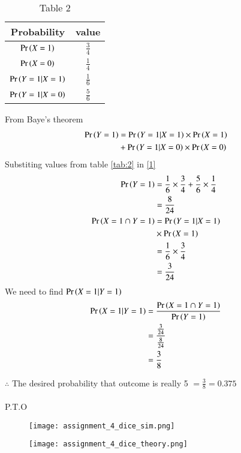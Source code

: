 \documentclass[journal,12pt,twocolumn]{IEEEtran}
\begin{document}
\begin{table}[h!]
\resizebox{7cm}{!}
{ 
\begin{tabular}{|c|c|}
\hline
Probability & value \\
\hline
$\Pr\left(X=1\right)$ & $\frac{3}{4}$ \\
\hline
$\Pr\left(X=0\right)$ &  $\frac{1}{4}$ \\
 \hline
$\Pr\left(Y=1|X=1\right)$ & $\frac{1}{6}$ \\
\hline
$\Pr\left(Y=1|X=0\right)$  &  $\frac{5}{6}$ \\
\hline
\end{tabular}
}
\caption{Table 2} 
\label{tab:2}
\end{table}

From Baye's theorem
\begin{align}
\Pr\left(Y=1\right)&=\Pr\left(Y=1|X=1\right) \times \Pr\left(X=1\right) \notag \\
 & +\Pr\left(Y=1|X=0\right) \times \Pr\left(X=0\right)  \label{1}
\end{align}
Substiting values from table \eqref{tab:2} in \eqref{1}
\begin{align}
\Pr\left(Y=1\right) &= \frac{1}{6} \times \frac{3}{4}  + \frac{5}{6} \times \frac{1}{4} \\
&=\frac{8}{24} \label{2} \\
\Pr\left(X=1 \cap Y=1\right)&= \Pr\left(Y=1|X=1\right) \notag \\
& \times \Pr\left(X=1\right) \\ 
&= \frac{1}{6} \times \frac{3}{4} \\
&= \frac{3}{24}  \label{3}
\end{align}
We need to find $\Pr\left(X=1|Y=1\right)$ 
\begin{align}
\Pr\left(X=1|Y=1\right) &= \frac{\Pr\left(X=1 \cap Y=1\right)}{\Pr\left(Y=1\right)} \\
&= \frac{\frac{3}{24}}{\frac{8}{24}} \\
&=\frac{3}{8}
\end{align}

 $\therefore$ The desired probability that outcome is really 5 $= \frac{3}{8}=0.375$ \\ \\
 P.T.O \\
\begin{figure}[htb!]
\begin{center}
\texttt{[image: assignment\_4\_dice\_sim.png]}
\end{center}
\end{figure}

\begin{figure}[htb!]
\begin{center}
\texttt{[image: assignment\_4\_dice\_theory.png]}
\end{center}
\end{figure}
\end{document}
